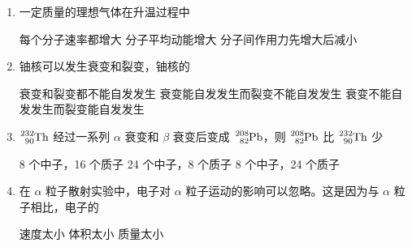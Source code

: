 \documentclass[\gkver]{gaokaozhenti}
\begin{document}
\begin{enumerate}
\item
一定质量的理想气体在升温过程中

{每个分子速率都增大}
{分子平均动能增大}
{分子间作用力先增大后减小}


\item
铀核可以发生衰变和裂变，铀核的

{衰变和裂变都不能自发发生}
{衰变能自发发生而裂变不能自发发生}
{衰变不能自发发生而裂变能自发发生}


\item
$\ce{^{232}_{90}Th}$ 经过一系列 $\alpha$ 衰变和 $\beta$ 衰变后变成 $\ce{^{208}_{82}Pb}$，则 $\ce{^{208}_{82}Pb}$ 比 $\ce{^{232}_{90}Th}$ 少

{8 个中子，16 个质子}
{24 个中子，8 个质子}
{8 个中子，24 个质子}


\item
在 $\alpha$ 粒子散射实验中，电子对 $\alpha$ 粒子运动的影响可以忽略。这是因为与 $\alpha$ 粒子相比，电子的

{速度太小}
{体积太小}
{质量太小}


\end{enumerate}
\end{document}
